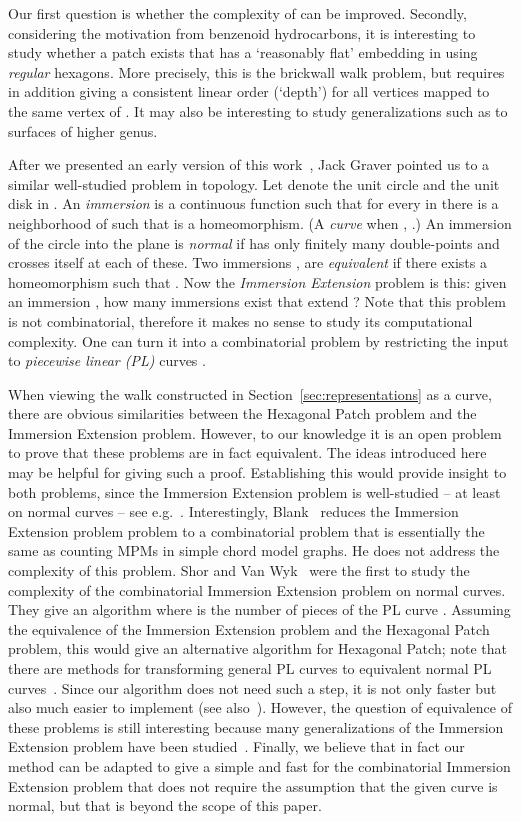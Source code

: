 \documentclass{llncs}
\begin{document}
Our first question is whether the complexity of  can be improved.
Secondly, considering the motivation from benzenoid hydrocarbons, it is interesting to study whether a patch exists that has a `reasonably flat' embedding in  using {\em regular} hexagons. More precisely, this is the brickwall walk problem, but requires in addition giving a consistent linear order (`depth') for all vertices 
mapped to the same vertex of .
It may also be interesting to study generalizations 
such as to surfaces of higher genus. 

After we presented an early version of this work~\cite{BB08}, Jack Graver 
pointed us to a similar well-studied problem in topology. 
Let  denote the unit circle and  the unit disk in . An {\em immersion} is a continuous function  such that for every  in  there is a neighborhood  of  such that  is a homeomorphism. 
(A {\em curve} when , .)
An immersion  of the circle into the plane is {\em normal} if  has only finitely many double-points and  crosses itself at each of these. Two immersions ,  are
{\em equivalent} if there exists a homeomorphism  such that .
Now the {\em Immersion Extension} problem is this: given an immersion , how many immersions  exist that extend ?  
Note that this problem is not combinatorial, therefore it makes no sense to study its computational complexity. One can turn it into a combinatorial problem by restricting the input to {\em piecewise linear (PL)} curves .

When viewing the walk constructed in Section~\ref{sec:representations} as a curve, there are obvious similarities between the Hexagonal Patch problem and the Immersion Extension problem. However, to our knowledge it is an open problem to prove that these problems are in fact equivalent. 
The ideas introduced here may be helpful for giving such a proof.
Establishing this would provide insight to both problems, since
the Immersion Extension problem is well-studied -- at least on normal curves -- see e.g.~\cite{Bla67,EM08,SW92}. 
Interestingly, Blank~\cite{Bla67,Fra70} reduces the Immersion Extension problem problem to a combinatorial problem that is essentially the same as counting MPMs in simple chord model graphs. He does not address the complexity of this problem. Shor and Van Wyk~\cite{SW92} were the first to study the complexity of the combinatorial Immersion Extension problem on normal curves. They give an  algorithm where  is the number of pieces of the PL curve .
Assuming the equivalence of the Immersion Extension problem and the Hexagonal Patch problem, this would give an alternative algorithm for Hexagonal Patch; note that there are methods for transforming general PL curves to equivalent normal PL curves~\cite{Sei98}.
Since our algorithm does not need such a step, it is not only faster but also much easier to implement (see also~\cite{Sei98}).
However, the question of equivalence of these problems is still interesting because many generalizations of the Immersion Extension problem have been studied~\cite{EM08}.
Finally, we believe that in fact our method can be adapted to give a simple and fast 
for the combinatorial Immersion Extension problem that does not require the assumption that the given curve is normal, but that is beyond the scope of this paper.
\end{document}

